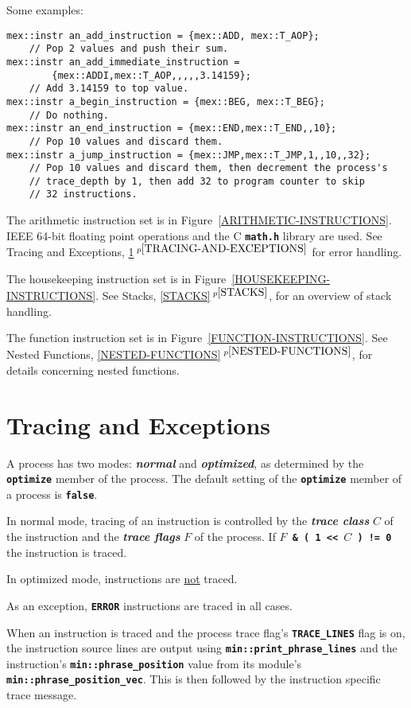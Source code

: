 \documentclass[12pt]{article}
\newcommand{\TT}[1]{{\tt \bfseries #1}}
\newcommand{\key}[1]{{\bf \em #1}\index{#1}}
\newcommand{\itemref}[1]{\ref{#1}$\,^{p\pageref{#1}}$}
\newcommand{\EOL}{\penalty \exhyphenpenalty}
\newenvironment{indpar}[1][0.3in]%
	{\begin{list}{}%
		     {\setlength{\itemsep}{0in}%
		      \setlength{\topsep}{0in}%
		      \setlength{\parsep}{1ex}%
		      \setlength{\labelwidth}{#1}%
		      \setlength{\leftmargin}{#1}%
		      \addtolength{\leftmargin}{\labelsep}}%
	 \item}%
	{\end{list}}
\begin{document}
Some examples:
\begin{indpar}\begin{verbatim}
mex::instr an_add_instruction = {mex::ADD, mex::T_AOP};
    // Pop 2 values and push their sum.
mex::instr an_add_immediate_instruction =
        {mex::ADDI,mex::T_AOP,,,,,3.14159};
    // Add 3.14159 to top value.
mex::instr a_begin_instruction = {mex::BEG, mex::T_BEG};
    // Do nothing.
mex::instr an_end_instruction = {mex::END,mex::T_END,,10};
    // Pop 10 values and discard them.
mex::instr a_jump_instruction = {mex::JMP,mex::T_JMP,1,,10,,32};
    // Pop 10 values and discard them, then decrement the process's
    // trace_depth by 1, then add 32 to program counter to skip
    // 32 instructions.
\end{verbatim}\end{indpar}

The arithmetic instruction set is in Figure~\ref{ARITHMETIC-INSTRUCTIONS}.
IEEE 64-bit floating point operations and the C \TT{math.h}
library are used.  See Tracing and Exceptions,
\itemref{TRACING-AND-EXCEPTIONS} for error
handling.

The housekeeping instruction set is in
Figure~\ref{HOUSEKEEPING-INSTRUCTIONS}.
See Stacks, \itemref{STACKS}, for an overview of stack handling.

The function instruction set is in
Figure~\ref{FUNCTION-INSTRUCTIONS}.
See Nested Functions, \itemref{NESTED-FUNCTIONS},
for details concerning nested functions.

\section{Tracing and Exceptions}
\label{TRACING-AND-EXCEPTIONS}

A process has two modes: \key{normal} and \key{optimized}, as
determined by the \TT{optimize} member of the process.
The default setting of the \TT{optimize} member of a process
is \TT{false}.

In normal mode, tracing of an instruction
is controlled by the \key{trace class} $C$ of the instruction
and the \key{trace flags} $F$ of the process.  If
\TT{$F$ \& ( 1 <{}< $C$ ) != 0} the instruction is traced.

In optimized mode, instructions are \underline{not} traced.

As an exception, \TT{ERROR} instructions are traced in all cases.

When an instruction is traced and the process
trace flag's \TT{TRACE\_LINES} flag is on,
the instruction source lines are output
using \TT{min::\EOL print\_\EOL phrase\_\EOL lines} and the
instruction's \TT{min::\EOL phrase\_\EOL position} value from its module's
\TT{min::phrase\_\EOL position\_\EOL vec}.  This is then followed by
the instruction specific trace message.
\end{document}
